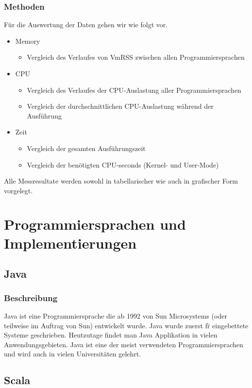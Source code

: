 \documentclass{fancydocument}
\begin{document}
\subsubsection{Methoden}
Für die Auswertung der Daten gehen wir wie folgt vor.
\begin{itemize}
\item Memory
\begin{itemize}
\item Vergleich des Verlaufes von VmRSS zwischen allen Programmiersprachen
\end{itemize}
\item CPU
\begin{itemize}
\item Vergleich des Verlaufes der CPU-Auslastung aller Programmiersprachen
\item Vergleich der durchschnittlichen CPU-Auslastung während der Ausführung
\end{itemize}
\item Zeit
\begin{itemize}
\item Vergleich der gesamten Ausführungszeit
\item Vergleich der benötigten CPU-seconds (Kernel- und User-Mode)
\end{itemize}
\end{itemize}
Alle Messresultate werden sowohl in tabellarischer wie auch in grafischer Form vorgelegt.
\section{Programmiersprachen und Implementierungen}

\subsection{Java}
\subsubsection{Beschreibung}

Java ist eine Programmiersprache die ab 1992 von Sun Microsystems (oder
teilweise im Auftrag von Sun) entwickelt wurde. Java wurde zuerst f\"r
eingebettete Systeme geschrieben. Heutzutage findet man Java Applikation in
vielen Anwendungsgebieten.
Java ist eine der meist verwendeten Programmiersprachen und wird auch
in vielen Universitäten gelehrt. 

\subsection{Scala}
\end{document}
